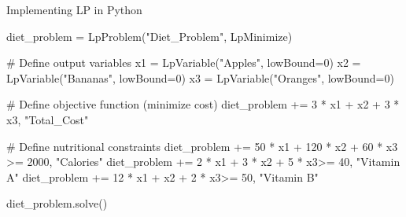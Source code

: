 \documentclass[
  ignorenonframetext,
]{beamer}
\newenvironment{Shaded}{\begin{snugshade}}{\end{snugshade}}
\newcommand{\CommentTok}[1]{\textcolor[rgb]{0.37,0.37,0.37}{#1}}
\newcommand{\DecValTok}[1]{\textcolor[rgb]{0.68,0.00,0.00}{#1}}
\newcommand{\NormalTok}[1]{\textcolor[rgb]{0.00,0.23,0.31}{#1}}
\newcommand{\OperatorTok}[1]{\textcolor[rgb]{0.37,0.37,0.37}{#1}}
\newcommand{\StringTok}[1]{\textcolor[rgb]{0.13,0.47,0.30}{#1}}
\begin{document}
\begin{frame}[fragile]{Implementing LP in Python}
\protect\hypertarget{implementing-lp-in-python-1}{}
\begin{Shaded}
\begin{Highlighting}[]
\NormalTok{diet\_problem }\OperatorTok{=}\NormalTok{ LpProblem(}\StringTok{"Diet\_Problem"}\NormalTok{, LpMinimize)}

\CommentTok{\# Define output variables}
\NormalTok{x1 }\OperatorTok{=}\NormalTok{ LpVariable(}\StringTok{"Apples"}\NormalTok{, lowBound}\OperatorTok{=}\DecValTok{0}\NormalTok{)}
\NormalTok{x2 }\OperatorTok{=}\NormalTok{ LpVariable(}\StringTok{"Bananas"}\NormalTok{, lowBound}\OperatorTok{=}\DecValTok{0}\NormalTok{)}
\NormalTok{x3 }\OperatorTok{=}\NormalTok{ LpVariable(}\StringTok{"Oranges"}\NormalTok{, lowBound}\OperatorTok{=}\DecValTok{0}\NormalTok{)}

\CommentTok{\# Define objective function (minimize cost)}
\NormalTok{diet\_problem }\OperatorTok{+=} \DecValTok{3} \OperatorTok{*}\NormalTok{ x1 }\OperatorTok{+}\NormalTok{ x2 }\OperatorTok{+} \DecValTok{3} \OperatorTok{*}\NormalTok{ x3, }\StringTok{"Total\_Cost"}

\CommentTok{\# Define nutritional constraints}
\NormalTok{diet\_problem }\OperatorTok{+=} \DecValTok{50} \OperatorTok{*}\NormalTok{ x1 }\OperatorTok{+} \DecValTok{120} \OperatorTok{*}\NormalTok{ x2 }\OperatorTok{+} \DecValTok{60} \OperatorTok{*}\NormalTok{ x3 }\OperatorTok{\textgreater{}=} \DecValTok{2000}\NormalTok{, }\StringTok{"Calories"}
\NormalTok{diet\_problem }\OperatorTok{+=} \DecValTok{2} \OperatorTok{*}\NormalTok{ x1 }\OperatorTok{+} \DecValTok{3} \OperatorTok{*}\NormalTok{ x2 }\OperatorTok{+} \DecValTok{5} \OperatorTok{*}\NormalTok{ x3}\OperatorTok{\textgreater{}=} \DecValTok{40}\NormalTok{, }\StringTok{"Vitamin A"}
\NormalTok{diet\_problem }\OperatorTok{+=} \DecValTok{12} \OperatorTok{*}\NormalTok{ x1 }\OperatorTok{+}\NormalTok{ x2 }\OperatorTok{+} \DecValTok{2} \OperatorTok{*}\NormalTok{ x3}\OperatorTok{\textgreater{}=} \DecValTok{50}\NormalTok{, }\StringTok{"Vitamin B"}

\NormalTok{diet\_problem.solve()}
\end{Highlighting}
\end{Shaded}
\end{frame}
\end{document}
